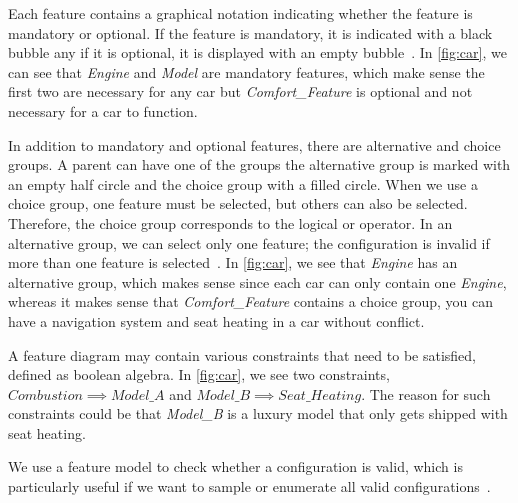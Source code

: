 Each feature contains a graphical notation indicating whether the feature is mandatory or optional. 
If the feature is mandatory, it is indicated with a black bubble any if it is optional, it is displayed with an empty bubble~\cite{Feature-Oriented-Software-Product-Lines-Feature-models}. 
In \autoref{fig:car}, we can see that \textit{Engine} and \textit{Model} are mandatory features, which make sense the first two are necessary for any car 
but \textit{Comfort\_Feature} is optional and not necessary for a car to function.

In addition to mandatory and optional features, there are alternative and choice groups. 
A parent can have one of the groups the alternative group is marked with an empty half circle and the choice group with a filled circle. 
When we use a choice group, one feature must be selected, but others can also be selected. Therefore, the choice group corresponds to the logical or operator. 
In an alternative group, we can select only one feature; the configuration is invalid if more than one feature is selected~\cite{Feature-Oriented-Software-Product-Lines-Feature-models}. 
In \autoref{fig:car}, we see that \textit{Engine} has an alternative group, which makes sense since each car can only contain one \textit{Engine}, 
whereas it makes sense that \textit{Comfort\_Feature} contains a choice group, you can have a navigation system and seat heating in a car without conflict.

A feature diagram may contain various constraints that need to be satisfied, defined as boolean algebra. In \autoref{fig:car}, we see two constraints, 
$Combustion \implies Model\_A$ and $Model\_B \implies Seat\_Heating$. The reason for such constraints could be that \textit{Model\_B} 
is a luxury model that only gets shipped with seat heating.

We use a feature model to check whether a configuration 
is valid, which is particularly useful if we want to sample or enumerate all valid configurations~\cite{Feature-Oriented-Software-Product-Lines-Feature-models}. 
